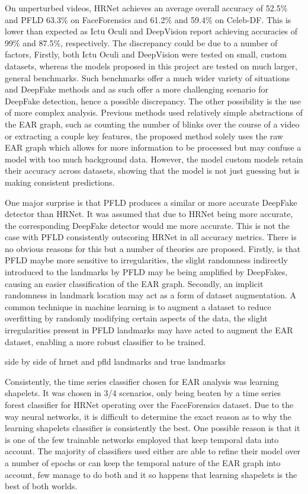 On unperturbed videos, HRNet achieves an average overall accuracy of 52.5\% and PFLD 63.3\% on FaceForensics and 61.2\% and 59.4\% on Celeb-DF. This is lower than expected as Ictu Oculi and DeepVision report achieving accuracies of 99\%\cite{li2018ictu} and 87.5\%\cite{jung2020deepvision}, respectively. The discrepancy could be due to a number of factors, Firstly, both Ictu Oculi and DeepVision were tested on small, custom datasets, whereas the models proposed in this project are tested on much larger, general benchmarks. Such benchmarks offer a much wider variety of situations and DeepFake methods and as such offer a more challenging scenario for DeepFake detection, hence a possible discrepancy. The other possibility is the use of more complex analysis. Previous methods used relatively simple abstractions of the EAR graph, such as counting the number of blinks over the course of a video or extracting a couple key features, the proposed method solely uses the raw EAR graph which allows for more information to be processed but may confuse a model with too much background data. However, the model custom models retain their accuracy across datasets, showing that the model is not just guessing but is making consistent predictions.

One major surprise is that PFLD produces a similar or more accurate DeepFake detector than HRNet. It was assumed that due to HRNet being more accurate, the corresponding DeepFake detector would me more accurate. This is not the case with PFLD consistently outscoring HRNet in all accuracy metrics. There is no obvious reasons for this but a number of theories are proposed. Firstly, is that PFLD maybe more sensitive to irregularities, the slight randomness indirectly introduced to the landmarks by PFLD may be being amplified by DeepFakes, causing an easier classification of the EAR graph. Secondly, an implicit randomness in landmark location may act as a form of dataset augmentation. A common technique in machine learning is to augment a dataset to reduce overfitting by randomly modifying certain aspects of the data, the slight irregularities present in PFLD landmarks may have acted to augment the EAR dataset, enabling a more robust classifier to be trained.

{\huge side by side of hrnet and pfld landmarks and true landmarks}

Consistently, the time series classifier chosen for EAR analysis was learning shapelets. It was chosen in 3/4 scenarios, only being beaten by a time series forest classifier for HRNet operating over the FaceForensics dataset. Due to the way neural networks, it is difficult to determine the exact reason as to why the learning shapelets classifier is consistently the best. One possible reason is that it is one of the few trainable networks employed that keep temporal data into account. The majority of classifiers used either are able to refine their model over a number of epochs or can keep the temporal nature of the EAR graph into account, few manage to do both and it so happens that learning shapelets is the best of both worlds.

